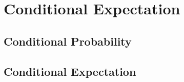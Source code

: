 \chapter{Conditional Expectation}

\section{Conditional Probability}

\section{Conditional Expectation}











